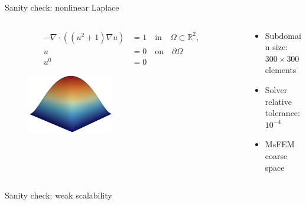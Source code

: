 \begin{frame}[noframenumbering]{Sanity check: nonlinear Laplace}
    \begin{columns}
        \begin{column}{0.47\textwidth}
                \begin{align*}
                    -\nabla\cdot((u^2+1)\nabla u)&=1\quad \text{in}\quad \Omega\subset\mathbb{R}^2,\\
                    u &= 0\quad\text{on}\quad\partial\Omega\\
                    u^0 &= 0
                \end{align*}
                \begin{figure}
                    \centering
                    \includegraphics[width=0.45\textwidth]{images/laplace}
                \end{figure}
        \end{column}
        \begin{column}{0.53\textwidth}
               \begin{itemize}
                \setlength{\itemsep}{10pt}
                \item Subdomain size: $300\times300$ elements
                \item Solver relative tolerance: $10^{-4}$
                \item MsFEM coarse space
               \end{itemize} 
        \end{column}
    \end{columns}
 \end{frame}
 
 \begin{frame}[noframenumbering]{Sanity check: weak scalability}
  \begin{figure}
      \centering
      
  \end{figure}
 \end{frame}
